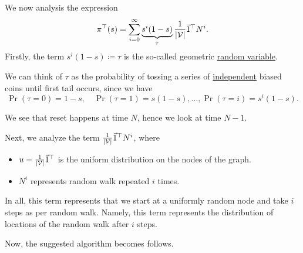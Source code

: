 We now analysis the expression
\[
	\pi^{\top}(s) = \sum\limits_{i=0}^{\infty} \underbrace{s^i (1 - s)}_{\tau}\frac{1}{\left\vert \mathcal{\MakeUppercase{v}}  \right\vert}\vec{1}^{\top}N^i.
\]
Firstly, the term \(s^i(1-s) \coloneqq \tau\) is the so-called geometric \hyperref[def:random-variable]{random variable}.
\begin{intuition}\label{int:geometric-random-variable}
	We can think of \(\tau\) as the probability of tossing a series of \hyperref[def:independent]{independent} biased coins until first tail occurs, since we have
	\[
		\Pr(\tau = 0) = 1 - s,\quad
		\Pr(\tau = 1) = s(1 - s), \ldots,
		\Pr(\tau = i) = s^i(1 - s).
	\]
\end{intuition}
\begin{remark}
	We see that reset happens at time \(N\), hence we look at time \(N-1\).
\end{remark}

Next, we analyze the term \(\frac{1}{\left\vert \mathcal{\MakeUppercase{v}}  \right\vert}\vec{1}^{\top}N^i\), where
\begin{itemize}
	\item \(u = \frac{1}{\left\vert \mathcal{\MakeUppercase{v}}  \right\vert}\vec{1}^{\top}\) is the uniform distribution on the nodes of the graph.
	\item \(N^i\) represents random walk repeated \(i\) times.
\end{itemize}

\begin{intuition}
	In all, this term represents that we start at a uniformly random node and take \(i\) steps as per random walk. Namely, this term represents the distribution of locations of the random walk after \(i\) steps.
\end{intuition}

Now, the suggested algorithm becomes follows.

